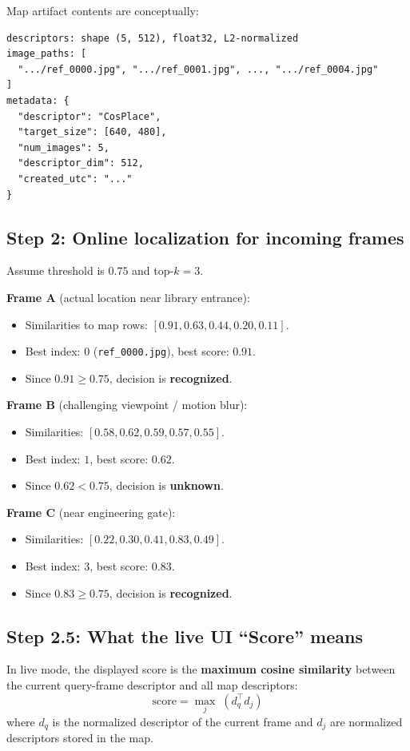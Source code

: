 \documentclass[11pt]{article}
\newcommand{\file}[1]{\texttt{#1}}
\begin{document}
Map artifact contents are conceptually:
\begin{lstlisting}[style=repo, caption={Contrived ReferenceMap payload}]
descriptors: shape (5, 512), float32, L2-normalized
image_paths: [
  ".../ref_0000.jpg", ".../ref_0001.jpg", ..., ".../ref_0004.jpg"
]
metadata: {
  "descriptor": "CosPlace",
  "target_size": [640, 480],
  "num_images": 5,
  "descriptor_dim": 512,
  "created_utc": "..."
}
\end{lstlisting}

\subsection{Step 2: Online localization for incoming frames}
Assume threshold is $0.75$ and top-$k=3$.

\textbf{Frame A} (actual location near library entrance):
\begin{itemize}[leftmargin=*]
  \item Similarities to map rows: $[0.91, 0.63, 0.44, 0.20, 0.11]$.
  \item Best index: $0$ (\file{ref\_0000.jpg}), best score: $0.91$.
  \item Since $0.91 \ge 0.75$, decision is \textbf{recognized}.
\end{itemize}

\textbf{Frame B} (challenging viewpoint / motion blur):
\begin{itemize}[leftmargin=*]
  \item Similarities: $[0.58, 0.62, 0.59, 0.57, 0.55]$.
  \item Best index: $1$, best score: $0.62$.
  \item Since $0.62 < 0.75$, decision is \textbf{unknown}.
\end{itemize}

\textbf{Frame C} (near engineering gate):
\begin{itemize}[leftmargin=*]
  \item Similarities: $[0.22, 0.30, 0.41, 0.83, 0.49]$.
  \item Best index: $3$, best score: $0.83$.
  \item Since $0.83 \ge 0.75$, decision is \textbf{recognized}.
\end{itemize}

\subsection{Step 2.5: What the live UI ``Score'' means}
In live mode, the displayed score is the \textbf{maximum cosine similarity} between the current query-frame descriptor and all map descriptors:
$$
\mathrm{score} = \max_j\; (d_q^\top d_j)
$$
where $d_q$ is the normalized descriptor of the current frame and $d_j$ are normalized descriptors stored in the map.
\end{document}
